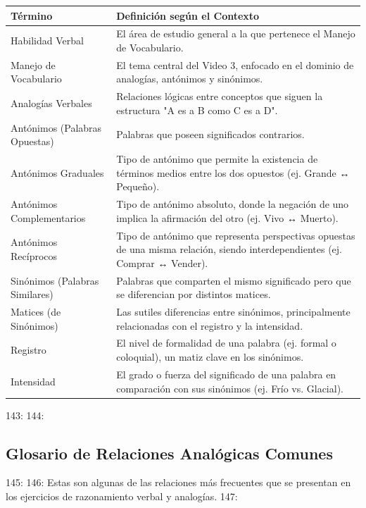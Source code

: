 \documentclass[a4paper,12pt]{ctexart}
\begin{document}
\begin{table}[htbp]
\centering
\begin{tabular}{l l}
\toprule
Término & Definición según el Contexto \\
\midrule
Habilidad Verbal & El área de estudio general a la que pertenece el Manejo de Vocabulario. \\
Manejo de Vocabulario & El tema central del Video 3, enfocado en el dominio de analogías, antónimos y sinónimos. \\
Analogías Verbales & Relaciones lógicas entre conceptos que siguen la estructura "A es a B como C es a D". \\
Antónimos (Palabras Opuestas) & Palabras que poseen significados contrarios. \\
Antónimos Graduales & Tipo de antónimo que permite la existencia de términos medios entre los dos opuestos (ej. Grande ↔ Pequeño). \\
Antónimos Complementarios & Tipo de antónimo absoluto, donde la negación de uno implica la afirmación del otro (ej. Vivo ↔ Muerto). \\
Antónimos Recíprocos & Tipo de antónimo que representa perspectivas opuestas de una misma relación, siendo interdependientes (ej. Comprar ↔ Vender). \\
Sinónimos (Palabras Similares) & Palabras que comparten el mismo significado pero que se diferencian por distintos matices. \\
Matices (de Sinónimos) & Las sutiles diferencias entre sinónimos, principalmente relacionadas con el registro y la intensidad. \\
Registro & El nivel de formalidad de una palabra (ej. formal o coloquial), un matiz clave en los sinónimos. \\
Intensidad & El grado o fuerza del significado de una palabra en comparación con sus sinónimos (ej. Frío vs. Glacial). \\
\bottomrule
\end{tabular}
\end{table}
143: 
144: \subsection{Glosario de Relaciones Analógicas Comunes}
145: 
146: Estas son algunas de las relaciones más frecuentes que se presentan en los ejercicios de razonamiento verbal y analogías.
147: 
\end{document}
